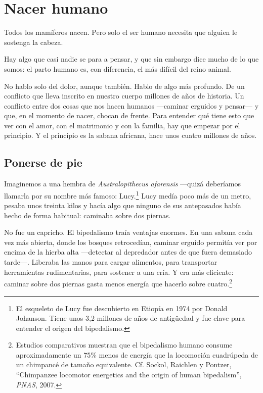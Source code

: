 \chapter{Nacer humano}

\epigraph{Todos los mamíferos nacen. Pero solo el ser humano necesita que alguien le sostenga la cabeza.}{}

Hay algo que casi nadie se para a pensar, y que sin embargo dice mucho de lo que somos: el parto humano es, con diferencia, el más difícil del reino animal.

No hablo solo del dolor, aunque también. Hablo de algo más profundo. De un conflicto que lleva inscrito en nuestro cuerpo millones de años de historia. Un conflicto entre dos cosas que nos hacen humanos ---caminar erguidos y pensar--- y que, en el momento de nacer, chocan de frente. Para entender qué tiene esto que ver con el amor, con el matrimonio y con la familia, hay que empezar por el principio. Y el principio es la sabana africana, hace unos cuatro millones de años.

\section{Ponerse de pie}

Imaginemos a una hembra de \textit{Australopithecus afarensis} ---quizá deberíamos llamarla por su nombre más famoso: Lucy.\footnote{El esqueleto de Lucy fue descubierto en Etiopía en 1974 por Donald Johanson. Tiene unos 3,2 millones de años de antigüedad y fue clave para entender el origen del bipedalismo.} Lucy medía poco más de un metro, pesaba unos treinta kilos y hacía algo que ninguno de sus antepasados había hecho de forma habitual: caminaba sobre dos piernas.

No fue un capricho. El bipedalismo traía ventajas enormes. En una sabana cada vez más abierta, donde los bosques retrocedían, caminar erguido permitía ver por encima de la hierba alta ---detectar al depredador antes de que fuera demasiado tarde---. Liberaba las manos para cargar alimentos, para transportar herramientas rudimentarias, para sostener a una cría. Y era más eficiente: caminar sobre dos piernas gasta menos energía que hacerlo sobre cuatro.\footnote{Estudios comparativos muestran que el bipedalismo humano consume aproximadamente un 75\% menos de energía que la locomoción cuadrúpeda de un chimpancé de tamaño equivalente. Cf. Sockol, Raichlen y Pontzer, ``Chimpanzee locomotor energetics and the origin of human bipedalism'', \textit{PNAS}, 2007.}

